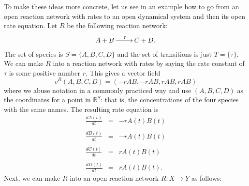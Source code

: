 \documentclass{compositionalityarticle}
\newcommand{\R}{\mathbb{R}}
\newcommand{\maps}{\colon}
\theoremstyle{plain}
\theoremstyle{remark}
\begin{document}
To make these ideas more concrete, let us see in an example how to go from an open reaction network with rates to an open dynamical system and then its open rate equation.  Let $R$ be the following reaction network:
\[   \xymatrix{ A+B \ar[r]^{\tau} & C + D. }  \] 
The set of species is $S = \{A,B,C,D\}$ and the set of transitions is just $T = \{\tau\}$.   We can make $R$ into a reaction network with rates by saying the rate constant of $\tau$ is some positive number $r$.   This gives a vector field 
\[      v^R(A,B,C,D) = (-r A B, -r A B, r A B, r A B) \]
where we abuse notation in a commonly practiced way and use $(A,B,C,D)$ as the  coordinates for a point in $\R^S$: that is, the concentrations of the four species
with the same names.  The resulting rate equation is
\[ 
\begin{array}{rcl} 
\displaystyle{\frac{dA(t)}{dt}} &=& - r A(t) B(t) \\ \\
\displaystyle{\frac{dB(t)}{dt}} &=& - r A(t) B(t) \\ \\
\displaystyle{\frac{dC(t)}{dt}}&=& r A(t) B(t) \\ \\
\displaystyle{\frac{dD(t)}{dt}} &=& r A(t) B(t) .
\end{array}
\]
Next, we can make $R$ into an open reaction network $R \maps X \to Y$ as follows:
\end{document}
